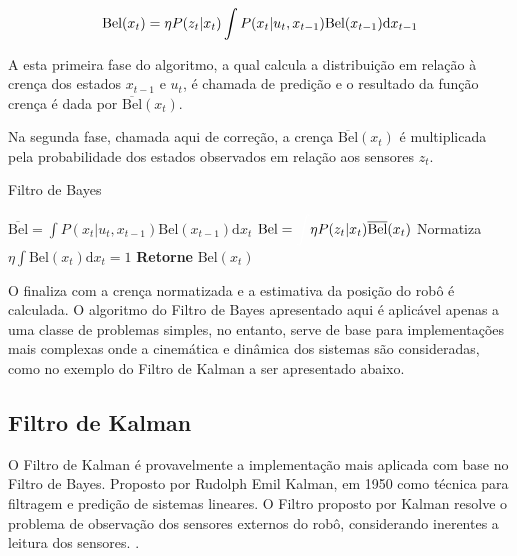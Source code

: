 \begin{equation}
    \label{eq:bayes2}
    \text{\text{Bel}}(x_t) = \eta P(z_t| x_t) \int P(x_t| u_t, x_{t-1}) \text{Bel}(x_{t-1})\text{d}x_{t-1}
\end{equation}

A esta primeira fase do algoritmo, a qual calcula a distribuição em relação à crença dos estados $x_{t-1}$ e $u_t$, é chamada de predição e o resultado da função crença é dada por $\overline{\text{Bel}}(x_t)$.

Na segunda fase, chamada aqui de correção, a crença $\overline{\text{Bel}}(x_t)$ é multiplicada pela probabilidade dos estados observados em relação aos sensores $z_t$.

\begin{algorithm}[H]
    \caption{Filtro de Bayes}
    \begin{algorithmic}[1]
        \State $\overline{\text{Bel}}= \displaystyle\int P(x_t| u_t, x_{t-1})\text{Bel}(x_{t-1})\text{d}x_t$
    \EndProcedure
        \State ${\text{Bel}}= \displaystyle\textcolor{white}{\int}  \eta P(z_t| x_{t})\overline{\text{Bel}}(x_{t})$
    \EndProcedure
    \State Normatiza $\eta \displaystyle\int \text{Bel}(x_t)\text{d}x_t = 1$
    \State \textbf{Retorne} $\text{Bel}(x_t)$
    \end{algorithmic}
    \label{algo:bayes}
\end{algorithm}

O  finaliza com a crença normatizada e a estimativa da posição do robô é calculada. O algoritmo do Filtro de Bayes apresentado aqui é aplicável apenas a uma classe de problemas simples, no entanto, serve de base para implementações mais complexas onde a cinemática e dinâmica dos sistemas são consideradas, como no exemplo do Filtro de Kalman a ser apresentado abaixo.

\subsection{Filtro de Kalman}

O Filtro de Kalman é provavelmente a implementação mais aplicada com base no Filtro de Bayes. Proposto por Rudolph Emil Kalman, em 1950 como técnica para filtragem e predição de sistemas lineares. O Filtro proposto por Kalman resolve o problema de observação dos sensores externos do robô, considerando inerentes a leitura dos sensores. \cite{thrun2006probalistic,romero2014robotica}.

